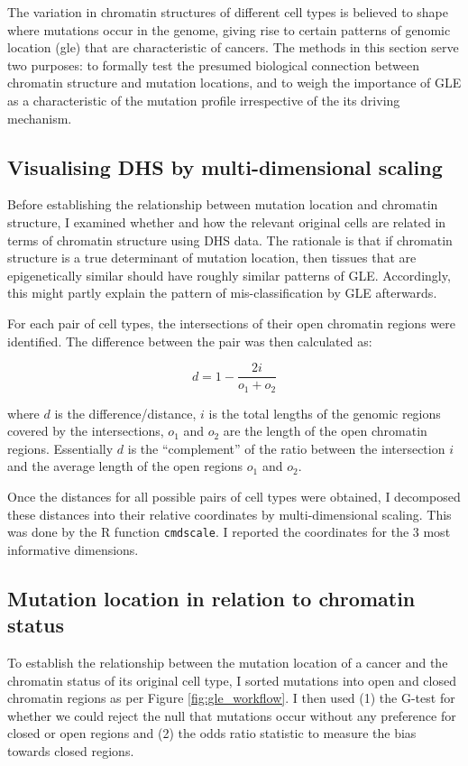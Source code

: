 The variation in chromatin structures of different cell types is believed to shape where mutations occur in the genome, giving rise to certain patterns of genomic location (\gls{gle}) that are characteristic of cancers. The methods in this section serve two purposes: to formally test the presumed biological connection between chromatin structure and mutation locations, and to weigh the importance of GLE as a characteristic of the mutation profile irrespective of the its driving mechanism.  

\subsection{Visualising DHS by multi-dimensional scaling}\label{methods:encode_pca}
Before establishing the relationship between mutation location and chromatin structure, I examined whether and how the relevant original cells are related in terms of chromatin structure using DHS data. The rationale is that if chromatin structure is a true determinant of mutation location, then tissues that are epigenetically similar should have roughly similar patterns of GLE. Accordingly, this might partly explain the pattern of mis-classification by GLE afterwards.

For each pair of cell types, the intersections of their open chromatin regions were identified. The difference between the pair was then calculated as:

\begin{equation}
    d = 1 - \frac{2i}{o_1 + o_2}
\end{equation}

where $d$ is the difference/distance, $i$ is the total lengths of the genomic regions covered by the intersections, $o_1$ and $o_2$ are the length of the open chromatin regions. Essentially $d$ is the ``complement'' of the ratio between the intersection $i$ and the average length of the open regions $o_1$ and $o_2$. 

Once the distances for all possible pairs of cell types were obtained, I decomposed these distances into their relative coordinates by multi-dimensional scaling. This was done by the R function \texttt{cmdscale}. I reported the coordinates for the 3 most informative dimensions. %

\subsection{Mutation location in relation to chromatin status}\label{methods:chromatin}
To establish the relationship between the mutation location of a cancer and the chromatin status of its original cell type, I sorted mutations into open and closed chromatin regions as per Figure \ref{fig:gle_workflow}. I then used (1) the G-test for whether we could reject the null that mutations occur without any preference for closed or open regions and (2) the odds ratio statistic to measure the bias towards closed regions.

